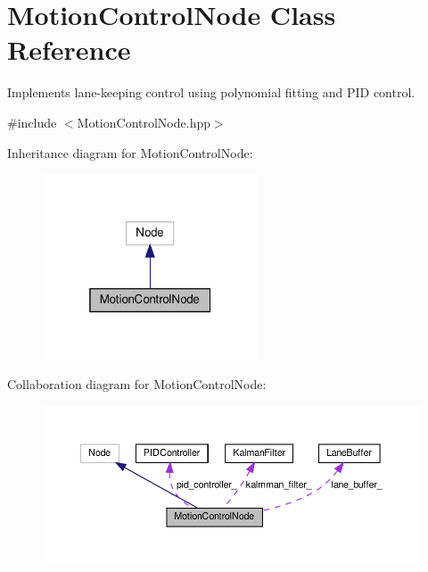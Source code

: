 \hypertarget{classMotionControlNode}{}\section{Motion\+Control\+Node Class Reference}
\label{classMotionControlNode}


Implements lane-\/keeping control using polynomial fitting and P\+ID control.  




{\ttfamily \#include $<$Motion\+Control\+Node.\+hpp$>$}



Inheritance diagram for Motion\+Control\+Node\+:
\nopagebreak
\begin{figure}[H]
\begin{center}
\leavevmode
\includegraphics[width=181pt]{classMotionControlNode__inherit__graph}
\end{center}
\end{figure}


Collaboration diagram for Motion\+Control\+Node\+:
\nopagebreak
\begin{figure}[H]
\begin{center}
\leavevmode
\includegraphics[width=350pt]{classMotionControlNode__coll__graph}
\end{center}
\end{figure}

